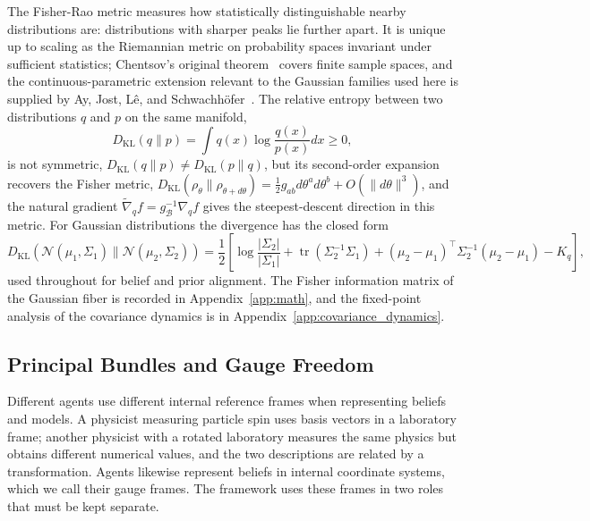 \documentclass[11pt]{article}
\begin{document}
The Fisher-Rao metric measures how statistically distinguishable nearby distributions are: distributions with sharper peaks lie further apart. It is unique up to scaling as the Riemannian metric on probability spaces invariant under sufficient statistics; Chentsov's original theorem~\cite{Cencov1982} covers finite sample spaces, and the continuous-parametric extension relevant to the Gaussian families used here is supplied by Ay, Jost, L\^{e}, and Schwachh\"{o}fer~\cite{AyJostLeSchwachhofer2017}. The relative entropy between two distributions $q$ and $p$ on the same manifold,
\begin{equation}
D_{\mathrm{KL}}(q \| p) = \int q(x) \log\frac{q(x)}{p(x)} dx \geq 0,
\end{equation}
is not symmetric, $D_{\mathrm{KL}}(q \| p) \neq D_{\mathrm{KL}}(p \| q)$, but its second-order expansion recovers the Fisher metric, $D_{\mathrm{KL}}(\rho_\theta \| \rho_{\theta+d\theta}) = \tfrac{1}{2} g_{ab} d\theta^a d\theta^b + O(\|d\theta\|^3)$, and the natural gradient $\tilde{\nabla}_q f = g^{-1}_{\mathcal{B}} \nabla_q f$ gives the steepest-descent direction in this metric. For Gaussian distributions the divergence has the closed form
\begin{equation}
D_{\mathrm{KL}}(\mathcal{N}(\mu_1, \Sigma_1) \| \mathcal{N}(\mu_2, \Sigma_2)) = \frac{1}{2}\left[\log\frac{|\Sigma_2|}{|\Sigma_1|} + \operatorname{tr}(\Sigma_2^{-1}\Sigma_1) + (\mu_2 - \mu_1)^\top\Sigma_2^{-1}(\mu_2 - \mu_1) - K_q\right],
\label{eq:gaussian_kl}
\end{equation}
used throughout for belief and prior alignment. The Fisher information matrix of the Gaussian fiber is recorded in Appendix~\ref{app:math}, and the fixed-point analysis of the covariance dynamics is in Appendix~\ref{app:covariance_dynamics}.

\subsection{Principal Bundles and Gauge Freedom}
\label{sec:agents_as_sections}

Different agents use different internal reference frames when representing beliefs and models. A physicist measuring particle spin uses basis vectors in a laboratory frame; another physicist with a rotated laboratory measures the same physics but obtains different numerical values, and the two descriptions are related by a transformation. Agents likewise represent beliefs in internal coordinate systems, which we call their gauge frames. The framework uses these frames in two roles that must be kept separate.
\end{document}
